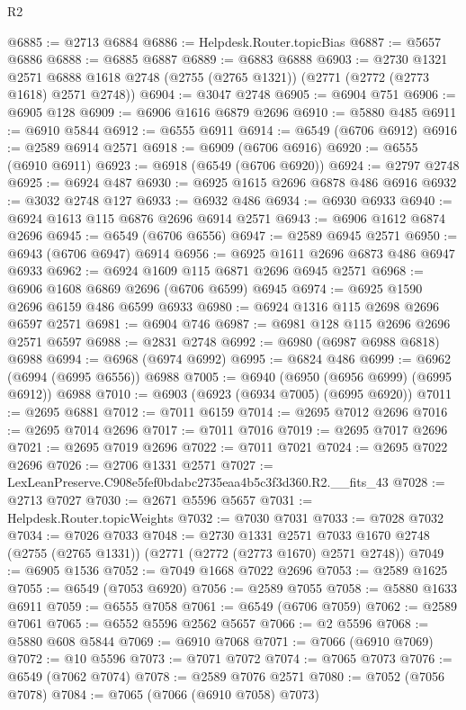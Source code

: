 \begin{lexlean}{R2}
\begin{coremodule}
@6885 := @2713 @6884
@6886 := Helpdesk.Router.topicBias
@6887 := @5657 @6886
@6888 := @6885 @6887
@6889 := @6883 @6888
@6903 := @2730
    @1321
    @2571
    @6888
    @1618
    @2748
    (@2755 (@2765 @1321))
    (@2771 (@2772 (@2773 @1618) @2571 @2748))
@6904 := @3047 @2748
@6905 := @6904 @751
@6906 := @6905 @128
@6909 := @6906 @1616 @6879 @2696
@6910 := @5880 @485
@6911 := @6910 @5844
@6912 := @6555 @6911
@6914 := @6549 (@6706 @6912)
@6916 := @2589 @6914 @2571
@6918 := @6909 (@6706 @6916)
@6920 := @6555 (@6910 @6911)
@6923 := @6918 (@6549 (@6706 @6920))
@6924 := @2797 @2748
@6925 := @6924 @487
@6930 := @6925 @1615 @2696 @6878 @486 @6916
@6932 := @3032 @2748 @127
@6933 := @6932 @486
@6934 := @6930 @6933
@6940 := @6924 @1613 @115 @6876 @2696 @6914 @2571
@6943 := @6906 @1612 @6874 @2696
@6945 := @6549 (@6706 @6556)
@6947 := @2589 @6945 @2571
@6950 := @6943 (@6706 @6947) @6914
@6956 := @6925 @1611 @2696 @6873 @486 @6947 @6933
@6962 := @6924 @1609 @115 @6871 @2696 @6945 @2571
@6968 := @6906 @1608 @6869 @2696 (@6706 @6599) @6945
@6974 := @6925 @1590 @2696 @6159 @486 @6599 @6933
@6980 := @6924 @1316 @115 @2698 @2696 @6597 @2571
@6981 := @6904 @746
@6987 := @6981 @128 @115 @2696 @2696 @2571 @6597
@6988 := @2831 @2748
@6992 := @6980 (@6987 @6988 @6818) @6988
@6994 := @6968 (@6974 @6992)
@6995 := @6824 @486
@6999 := @6962 (@6994 (@6995 @6556)) @6988
@7005 := @6940 (@6950 (@6956 @6999) (@6995 @6912)) @6988
@7010 := @6903 (@6923 (@6934 @7005) (@6995 @6920))
@7011 := @2695 @6881
@7012 := @7011 @6159
@7014 := @2695 @7012 @2696
@7016 := @2695 @7014 @2696
@7017 := @7011 @7016
@7019 := @2695 @7017 @2696
@7021 := @2695 @7019 @2696
@7022 := @7011 @7021
@7024 := @2695 @7022 @2696
@7026 := @2706 @1331 @2571
@7027 := LexLeanPreserve.C908e5fef0bdabc2735eaa4b5c3f3d360.R2.__fits_43
@7028 := @2713 @7027
@7030 := @2671 @5596 @5657
@7031 := Helpdesk.Router.topicWeights
@7032 := @7030 @7031
@7033 := @7028 @7032
@7034 := @7026 @7033
@7048 := @2730
    @1331
    @2571
    @7033
    @1670
    @2748
    (@2755 (@2765 @1331))
    (@2771 (@2772 (@2773 @1670) @2571 @2748))
@7049 := @6905 @1536
@7052 := @7049 @1668 @7022 @2696
@7053 := @2589 @1625
@7055 := @6549 (@7053 @6920)
@7056 := @2589 @7055
@7058 := @5880 @1633 @6911
@7059 := @6555 @7058
@7061 := @6549 (@6706 @7059)
@7062 := @2589 @7061
@7065 := @6552 @5596 @2562 @5657
@7066 := @2 @5596
@7068 := @5880 @608 @5844
@7069 := @6910 @7068
@7071 := @7066 (@6910 @7069)
@7072 := @10 @5596
@7073 := @7071 @7072
@7074 := @7065 @7073
@7076 := @6549 (@7062 @7074)
@7078 := @2589 @7076 @2571
@7080 := @7052 (@7056 @7078)
@7084 := @7065 (@7066 (@6910 @7058) @7073)

\end{coremodule}
\end{lexlean}
